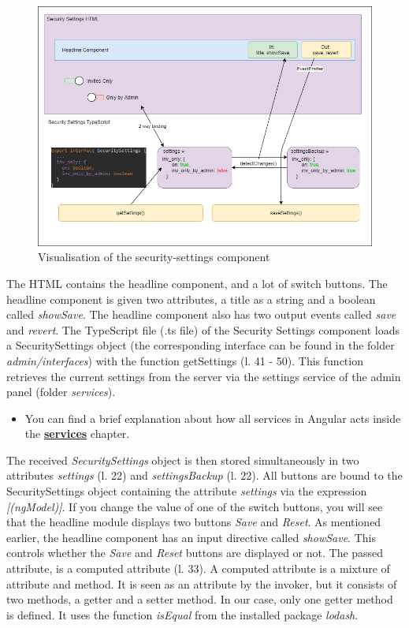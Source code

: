 \begin{figure}[h]
    \centering
    \includegraphics[width=1.0\textwidth]{./images/security_settings}
    \caption{Visualisation of the security-settings component}
    \label{fig:secset}
\end{figure}

The HTML contains the headline component, and a lot of switch buttons.
The headline component is given two attributes,
a title as a string and a boolean called \textit{showSave}.
The headline component also has two output events called \textit{save} and \textit{revert}.
The TypeScript file (.ts file) of the Security Settings component loads a SecuritySettings object (the corresponding
interface can be found in the folder \textit{admin/interfaces}) with the function getSettings (l. 41 - 50).
This function retrieves the current settings from the server via the settings service of the admin panel (folder
\textit{services}).

\begin{itemize}
    \item You can find a brief explanation about how all services in Angular acts inside the
        \hyperref[subsec:services]{\textbf{services}} chapter.
\end{itemize}

The received \textit{SecuritySettings} object is then stored simultaneously in two attributes \textit{settings}
(l. 22) and \textit{settingsBackup} (l. 22).
All buttons are bound to the SecuritySettings object containing the attribute \textit{settings} via the expression
\textit{[(ngModel)]}.
If you change the value of one of the switch buttons, you will see that the headline module displays two buttons
\textit{Save} and \textit{Reset}.
As mentioned earlier, the headline component has an input directive called \textit{showSave}.
This controls whether the \textit{Save} and \textit{Reset} buttons are displayed or not.
The passed attribute, is a computed attribute (l. 33).
A computed attribute is a mixture of attribute and method.
It is seen as an attribute by the invoker, but it consists of two methods, a getter and a setter method.
In our case, only one getter method is defined.
It uses the function \textit{isEqual} from the installed package \textit{lodash}.

